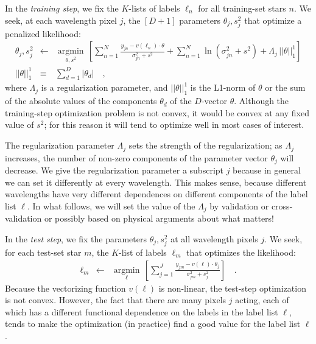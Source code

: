 \documentclass[12pt,preprint]{aastex}
\newcommand{\argmin}[1]{\underset{#1}{\operatorname{argmin}}\,}
\begin{document}
In the \emph{training step}, we fix the $K$-lists of labels $\ell_n$
for all training-set stars $n$.
We seek, at each wavelength pixel $j$, the $[D+1]$ parameters
$\theta_j,s^2_j$ that optimize a penalized likelihood:
\begin{eqnarray}
  \theta_j,s^2_j &\leftarrow& \argmin{\theta,s^2}\left[
    \sum_{n=1}^N \frac{y_{jn}-v(\ell_n)\cdot\theta}{\sigma^2_{jn}+s^2}
    + \sum_{n=1}^N \ln(\sigma^2_{jn}+s^2)
    + \Lambda_j\,||\theta||_1^1
    \right]
  \\
  ||\theta||_1^1 &\equiv& \sum_{d=1}^D |\theta_d|
  \quad ,
\end{eqnarray}
where $\Lambda_j$ is a regularization parameter, and $||\theta||_1^1$ is
the L1-norm of $\theta$ or the sum of the absolute values of the
components $\theta_d$ of the $D$-vector $\theta$.
Although the training-step optimization problem is not convex, it
would be convex at any fixed value of $s^2$; for this reason it will
tend to optimize well in most cases of interest.

The regularization parameter $\Lambda_j$ sets the strength of the
regularization; as $\Lambda_j$ increases, the number of non-zero
components of the parameter vector $\theta_j$ will decrease.
We give the regularization parameter a subscript $j$ because in
general we can set it differently at every wavelength.
This makes sense, because different wavelengths have very different
dependences on different components of the label list $\ell$.
In what follows, we will set the value of the $\Lambda_j$ by
validation or cross-validation or possibly based on physical arguments
about what matters!

In the \emph{test step}, we fix the parameters $\theta_j,s^2_j$ at all
wavelength pixels $j$.
We seek, for each test-set star $m$, the $K$-list of labels $\ell_m$
that optimizes the likelihood:
\begin{eqnarray}
  \ell_m &\leftarrow& \argmin{\ell}\left[
    \sum_{j=1}^J \frac{y_{jm}-v(\ell)\cdot\theta_j}{\sigma^2_{jm}+s^2_j}
    \right]
  \quad .
\end{eqnarray}
Because the vectorizing function $v(\ell)$ is non-linear, the
test-step optimization is not convex.
However, the fact that there are many pixels $j$ acting, each of which
has a different functional dependence on the labels in the label list
$\ell$, tends to make the optimization (in practice) find a good value
for the label list $\ell$.
\end{document}
